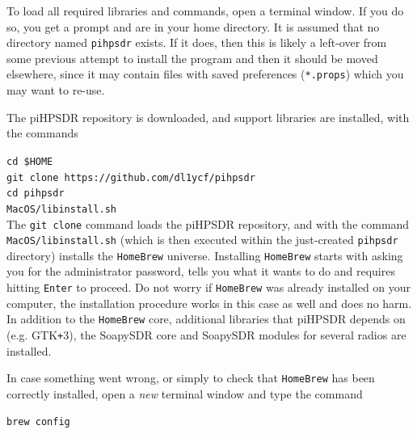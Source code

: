 \documentclass[12pt]{book}
\def\grtt#1{\texttt{\color{magenta}#1}}
\def\pH{pi\-HPSDR\xspace}
\begin{document}
To load all required libraries and commands, open a terminal window. If you do so, you get
a prompt and are in your home directory. It is assumed that no directory named \texttt{pihpsdr}
exists. If it does, then this is likely a left-over from some previous
attempt to install the program and then it should be moved elsewhere, since it may contain
files with saved preferences (\texttt{*.props}) which you may want to re-use.

The \pH repository is downloaded, and support libraries are installed, with the commands

\grtt{cd \$HOME} \\
\grtt{git clone https://github.com/dl1ycf/pihpsdr} \\
\grtt{cd pihpsdr} \\
\grtt{MacOS/libinstall.sh} \\

The \texttt{git clone} command loads the \pH repository, and with the command
\texttt{MacOS/libinstall.sh}
(which is then executed within the just-created \texttt{pihpsdr} directory) installs the
 \texttt{HomeBrew} universe. Installing \texttt{HomeBrew} starts with asking you for the administrator
 password, tells you what it wants to do and requires hitting \texttt{Enter} to proceed.
Do not worry if \texttt{HomeBrew} was already installed on your computer, the installation
procedure works in this case as well and does no harm. In addition to
 the \texttt{HomeBrew} core, additional libraries that \pH depends on (e.g. GTK\texttt{+}3), the SoapySDR
 core and SoapySDR modules for several radios are installed.

 In case something went wrong, or simply to check that \texttt{HomeBrew} has been correctly installed,
 open a \textit{new} terminal window and type the command


\grtt{brew config}
\end{document}
